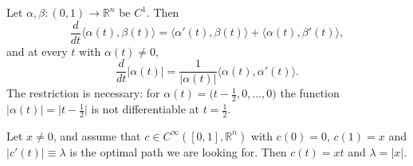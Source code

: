 \begin{lemma}
\label{lem:inner_product_derivative_identities}
Let $\alpha,\beta : (0,1) \to \mathbb{R}^n$ be $C^1$. Then
\[\frac{d}{dt}\langle\alpha(t),\beta(t)\rangle = \langle\alpha'(t),\beta(t)\rangle
  + \langle\alpha(t),\beta'(t)\rangle,\]
and at every $t$ with $\alpha(t) \neq 0$,
\[\frac{d}{dt}\lvert\alpha(t)\rvert = \frac{1}{\lvert\alpha(t)\rvert}\langle\alpha(t),\alpha'(t)\rangle.\]
The restriction is necessary: for $\alpha(t) = \big(t-\tfrac12,0,\dots,0\big)$ the function
$\lvert\alpha(t)\rvert = \lvert t-\tfrac12\rvert$ is not differentiable at $t=\tfrac12$.
\end{lemma}

\begin{proposition}
\label{prop:geodesic_straight_line}
Let $x \neq 0$, and assume that $c \in C^\infty([0,1],\mathbb{R}^n)$ with $c(0)=0$, $c(1)=x$ and
$\lvert c'(t)\rvert \equiv \lambda$ is the optimal path we are looking for. Then $c(t) = xt$
and $\lambda = \lvert x\rvert$.
\end{proposition}


